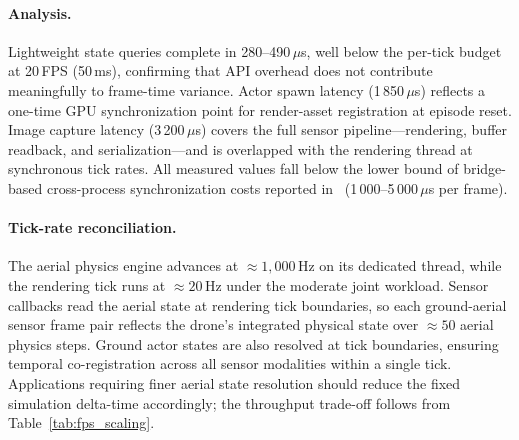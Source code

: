\paragraph{Analysis.}
Lightweight state queries complete in 280--490\,$\mu$s, well below the per-tick
budget at 20\,FPS (50\,ms), confirming that API overhead does not contribute
meaningfully to frame-time variance.
Actor spawn latency (1\,850\,$\mu$s) reflects a one-time GPU synchronization
point for render-asset registration at episode reset.
Image capture latency (3\,200\,$\mu$s) covers the full sensor
pipeline---rendering, buffer readback, and serialization---and is overlapped
with the rendering thread at synchronous tick rates.
All measured values fall below the lower bound of bridge-based cross-process
synchronization costs reported in~\cite{transimhub}
(1\,000--5\,000\,$\mu$s per frame).

\paragraph{Tick-rate reconciliation.}
The aerial physics engine advances at ${\approx}1{,}000$\,Hz on its dedicated
thread, while the rendering tick runs at ${\approx}20$\,Hz under the moderate
joint workload.
Sensor callbacks read the aerial state at rendering tick boundaries, so each
ground-aerial sensor frame pair reflects the drone's integrated physical state
over ${\approx}50$ aerial physics steps.
Ground actor states are also resolved at tick boundaries, ensuring temporal
co-registration across all sensor modalities within a single tick.
Applications requiring finer aerial state resolution should reduce the fixed
simulation delta-time accordingly; the throughput trade-off follows from
Table~\ref{tab:fps_scaling}.